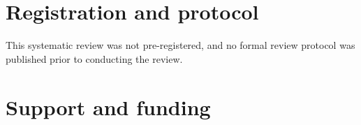 \documentclass[a4paper,fleqn]{cas-sc}
\begin{document}
%
%
%

	\printcredits


\section*{Registration and protocol}

This systematic review was not pre-registered, and no formal review protocol was published prior to conducting the review.

\section*{Support and funding}
\end{document}
